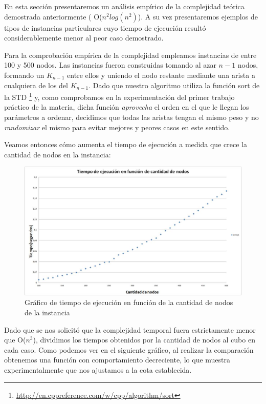 \documentclass[11pt, a4paper, twoside]{article}
\begin{document}
En esta sección presentaremos un análisis empírico de la complejidad teórica demostrada anteriormente ( O($n^2log(n^2)$). A su vez presentaremos ejemplos de tipos de instancias particulares cuyo tiempo de ejecución resultó considerablemente menor al peor caso demostrado.


Para la comprobación empírica de la complejidad empleamos instancias de entre 100 y 500 nodos. Las instancias fueron construidas tomando al azar $n-1$ nodos, formando un $K_{n-1}$ entre ellos y uniendo el nodo restante mediante una arista a cualquiera de los del $K_{n-1}$. Dado que nuestro algoritmo utiliza la función sort de la STD \footnote{\url{http://en.cppreference.com/w/cpp/algorithm/sort}} y, como comprobamos en la experimentación del primer trabajo práctico de la materia, dicha función \textit{aprovecha} el orden en el que le llegan los parámetros a ordenar, decidimos que todas las aristas tengan el mismo peso y no \textit{randomizar} el mismo para evitar mejores y peores casos en este sentido. 

Veamos entonces cómo aumenta el tiempo de ejecución a medida que crece la cantidad de nodos en la instancia: 

\begin{figure}[H]
\centering
\includegraphics[scale=0.5]{imagenes/graph3.jpg}
\caption{Gráfico de tiempo de ejecución en función de la cantidad de nodos de la instancia}
\end{figure}

Dado que se nos solicitó que la complejidad temporal fuera estrictamente menor que O($n^3$), dividimos los tiempos obtenidos por la cantidad de nodos al cubo en cada caso. Como podemos ver en el siguiente gráfico, al realizar la comparación obtenemos una función con comportamiento decreciente, lo que muestra experimentalmente que nos ajustamos a la cota establecida.
\end{document}
